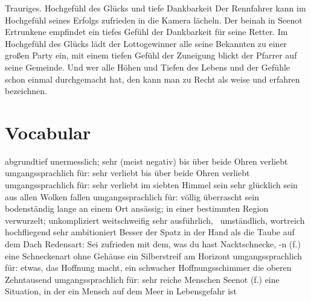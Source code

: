 \documentclass[14pt,a4paper]{extarticle}
\begin{document}
Trauriges.  Hochgefühl des Glücks und tiefe Dankbarkeit  Der Rennfahrer kann im Hochgefühl seines Erfolgs zufrieden in die Kamera lächeln. Der beinah in Seenot Ertrunkene empfindet ein tiefes Gefühl der Dankbarkeit für seine Retter. Im Hochgefühl des Glücks lädt der Lottogewinner alle seine Bekannten zu einer großen Party ein, mit einem tiefen Gefühl der Zuneigung blickt der Pfarrer auf seine Gemeinde. Und wer alle Höhen und Tiefen des Lebens und der Gefühle schon einmal durchgemacht hat, den kann man zu Recht als weise und erfahren bezeichnen.\newline\newline \newline\newline \section{Vocabular} abgrundtief unermesslich; sehr (meist negativ) \newline\newline  bis über beide Ohren verliebt umgangssprachlich für: sehr verliebt \newline\newline  bis über beide Ohren verliebt umgangssprachlich für: sehr verliebt \newline\newline  im siebten Himmel sein sehr glücklich sein \newline\newline  aus allen Wolken fallen umgangssprachlich für: völlig überrascht sein \newline\newline  bodenständig lange an einem Ort ansässig; in einer bestimmten Region verwurzelt; unkompliziert \newline\newline  weitschweifig sehr ausführlich,  umständlich, wortreich \newline\newline  hochfliegend sehr ambitioniert \newline\newline  Besser der Spatz in der Hand als die Taube auf dem Dach Redensart: Sei zufrieden mit dem, was du hast \newline\newline  Nacktschnecke, -n (f.) eine Schneckenart ohne Gehäuse \newline\newline  ein Silberstreif am Horizont umgangssprachlich für: etwas, das Hoffnung macht, ein schwacher Hoffnungsschimmer \newline\newline  die oberen Zehntausend umgangssprachlich für: sehr reiche Menschen \newline\newline  Seenot (f.) eine Situation, in der ein Mensch auf dem Meer in Lebensgefahr ist \newline\newline 
\end{document}
